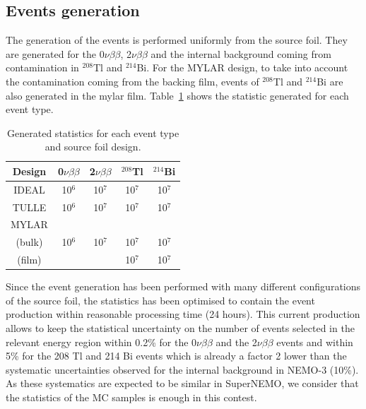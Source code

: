 \documentclass[main.tex]{subfiles}
\begin{document}
\subsection{Events generation}


\NI The generation of the events is performed uniformly from the source foil. They are generated for the 0$\nu\beta\beta$, 2$\nu\beta\beta$ and the internal background coming from contamination in $^{\text{208}}$Tl and $^{\text{214}}$Bi. For the MYLAR design, to take into account the contamination coming from the backing film, events of $^{\text{208}}$Tl and $^{\text{214}}$Bi are also generated in the mylar film. Table~\ref{Tab:GeneratedEventSource} shows the statistic generated for each event type. 


\begin{table}[h!]
\centering
\begin{tabular}{c|c|c|c|c}
Design & 0$\nu\beta\beta$ & 2$\nu\beta\beta$ & $^{\text{208}}$Tl & $^{\text{214}}$Bi  \\[0.1cm]
\toprule
IDEAL & 10$^{\text{6}}$ & 10$^{\text{7}}$ & 10$^{\text{7}}$ & 10$^{\text{7}}$  \\[0.02cm]
TULLE & 10$^{\text{6}}$ & 10$^{\text{7}}$ & 10$^{\text{7}}$ & 10$^{\text{7}}$  \\[0.02cm]
MYLAR &                 &                 &                 &                  \\[0.02cm]
(bulk)& 10$^{\text{6}}$ & 10$^{\text{7}}$ & 10$^{\text{7}}$ & 10$^{\text{7}}$  \\[0.02cm]
(film)&                 &                 & 10$^{\text{7}}$ & 10$^{\text{7}}$  \\[0.02cm]
\bottomrule
\end{tabular}
\caption{Generated statistics for each event type and source foil design.}
\label{Tab:GeneratedEventSource}
\end{table}


\NI Since the event generation has been performed with many different configurations of the source foil, the statistics has been optimised to contain the event production within reasonable processing time (24 hours).  This current production allows to keep the statistical uncertainty on the number of events selected in the relevant energy region within 0.2\% for the 0$\nu\beta\beta$ and the 2$\nu\beta\beta$ events and within 5\% for the 208 Tl and 214 Bi events which is already a factor 2 lower than the systematic uncertainties observed for the internal background in NEMO-3 (10\%). As these systematics are expected to be similar in SuperNEMO, we consider that the statistics of the MC samples is enough in this contest.
\end{document}
